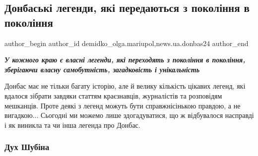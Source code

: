  
 
 
 
 
 
\subsection{Донбаські легенди, які передаються з покоління в покоління}
\label{sec:03_07_2022.stz.news.ua.donbas24.1.donbaski_legendy}
 
\ifcmt
 author_begin
   author_id demidko_olga.mariupol,news.ua.donbas24
 author_end
\fi


\begin{center}
  \em\color{blue}\bfseries\Large
У кожного краю є власні легенди, які переходять з покоління в покоління,
зберігаючи власну самобутність, загадковість і унікальність
\end{center}

Донбас має не тільки багату історію, але й велику кількість цікавих легенд, які
вдалося зібрати завдяки статтям краєзнавців, журналістів та розповідям
мешканців. Проте деякі з легенд можуть бути справжнісінькою правдою, а не
вигадкою... Сьогодні ми можемо лише здогадуватися, що ж відбувалося насправді і
як виникла та чи інша легенда про Донбас.

\subsubsection{Дух Шубіна}


